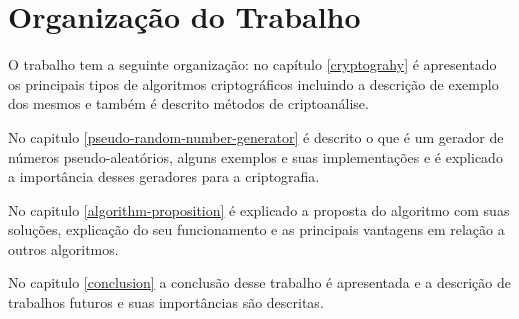 \section{Organização do Trabalho}
\label{paper-organization}

O trabalho tem a seguinte organização: no capítulo \ref{cryptograhy} é apresentado os principais tipos de algoritmos criptográficos incluindo a descrição de exemplo dos mesmos e também é descrito métodos de criptoanálise.

No capitulo \ref{pseudo-random-number-generator} é descrito o que é um gerador de números pseudo-aleatórios, alguns exemplos e suas implementações e é explicado a importância desses geradores para a criptografia. 

No capitulo \ref{algorithm-proposition} é explicado a proposta do algoritmo com suas soluções, explicação do seu funcionamento e as principais vantagens em relação a outros algoritmos.

No capitulo \ref{conclusion} a conclusão desse trabalho é apresentada e a descrição de trabalhos futuros e suas importâncias são descritas. 